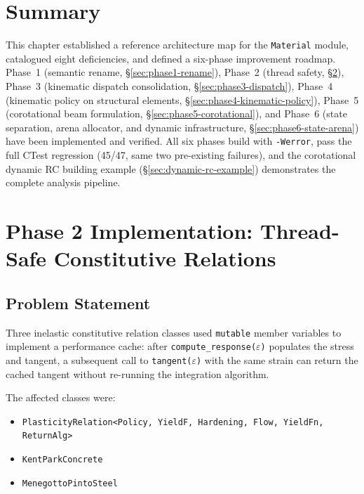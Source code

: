\section{Summary}
\label{sec:mat-improvements-summary}

This chapter established a reference architecture map for the
\texttt{Material} module, catalogued eight deficiencies, and defined
a six-phase improvement roadmap.
Phase~1 (semantic rename, \S\ref{sec:phase1-rename}),
Phase~2 (thread safety, \S\ref{sec:phase2-thread-safety}),
Phase~3 (kinematic dispatch consolidation, \S\ref{sec:phase3-dispatch}),
Phase~4 (kinematic policy on structural elements, \S\ref{sec:phase4-kinematic-policy}),
Phase~5 (corotational beam formulation, \S\ref{sec:phase5-corotational}), and
Phase~6 (state separation, arena allocator, and dynamic infrastructure,
\S\ref{sec:phase6-state-arena})
have been implemented and verified.
All six phases build with \texttt{-Werror}, pass the full CTest
regression (45/47, same two pre-existing failures), and the
corotational dynamic RC building example (\S\ref{sec:dynamic-rc-example})
demonstrates the complete analysis pipeline.


\section{Phase 2 Implementation: Thread-Safe Constitutive Relations}
\label{sec:phase2-thread-safety}

\subsection{Problem Statement}

Three inelastic constitutive relation classes used \texttt{mutable}
member variables to implement a performance cache: after
\texttt{compute\_response($\varepsilon$)} populates the stress and
tangent, a subsequent call to \texttt{tangent($\varepsilon$)} with the
same strain can return the cached tangent without re-running the
integration algorithm.

The affected classes were:
\begin{itemize}
  \item \texttt{PlasticityRelation<Policy, YieldF, Hardening, Flow, YieldFn, ReturnAlg>}
  \item \texttt{KentParkConcrete}
  \item \texttt{MenegottoPintoSteel}
\end{itemize}

